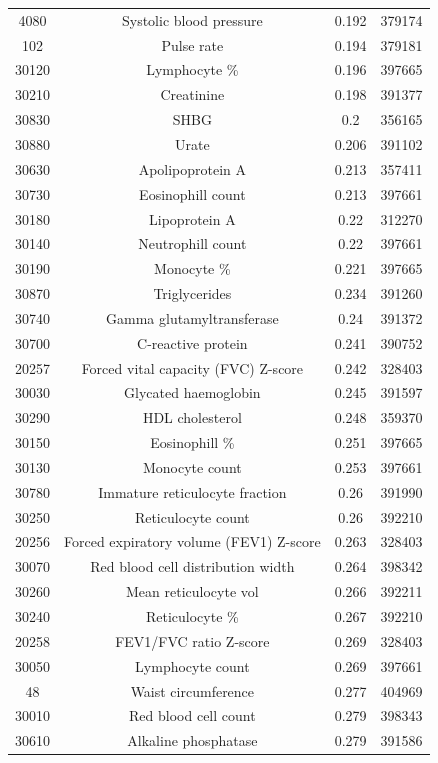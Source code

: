 \begin{longtable}{|c|c|c|c|}
4080 & Systolic blood pressure & 0.192 & 379174 \\
102 & Pulse rate & 0.194 & 379181 \\
30120 &  Lymphocyte \% & 0.196 & 397665 \\
30210 &  Creatinine & 0.198 & 391377  \\
30830 &  SHBG & 0.2 & 356165 \\
30880 &  Urate & 0.206 & 391102 \\
30630 &  Apolipoprotein A & 0.213 & 357411 \\
30730 &  Eosinophill count & 0.213 & 397661 \\
30180 &  Lipoprotein A & 0.22 & 312270 \\
30140 &  Neutrophill count & 0.22 & 397661  \\
30190 &  Monocyte \% & 0.221 & 397665 \\
30870 &  Triglycerides & 0.234 & 391260 \\
30740 &  Gamma glutamyltransferase & 0.24 & 391372 \\
30700 &  C-reactive protein & 0.241 & 390752 \\
20257 & Forced vital capacity (FVC) Z-score & 0.242 & 328403 \\
30030 &  Glycated haemoglobin & 0.245 & 391597  \\
30290 &  HDL cholesterol & 0.248 & 359370 \\
30150 &  Eosinophill \% & 0.251 & 397665 \\
30130 &  Monocyte count & 0.253 & 397661 \\
30780 &  Immature reticulocyte fraction & 0.26 & 391990 \\
30250 &  Reticulocyte count & 0.26 & 392210 \\
20256 & Forced expiratory volume (FEV1) Z-score & 0.263 & 328403\\
30070 &  Red blood cell distribution width & 0.264 & 398342  \\
30260 &  Mean reticulocyte vol & 0.266 & 392211 \\
30240 &  Reticulocyte \% & 0.267 & 392210 \\
20258 & FEV1/FVC ratio Z-score & 0.269 & 328403\\
30050 &  Lymphocyte count & 0.269 & 397661 \\
48 & Waist circumference & 0.277 & 404969\\
30010 &  Red blood cell count & 0.279 & 398343 \\
30610 &  Alkaline phosphatase & 0.279 & 391586 \\

\end{longtable}
